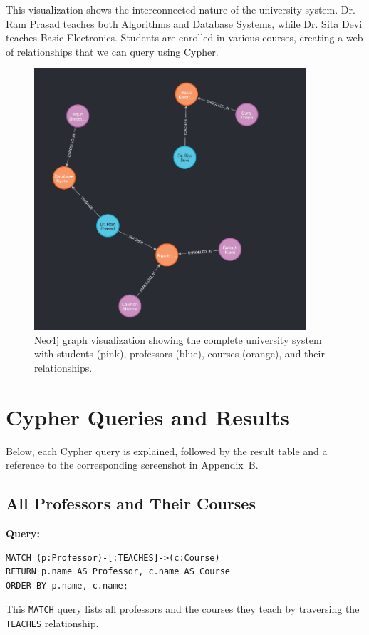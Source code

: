 This visualization shows the interconnected nature of the university system. Dr. Ram Prasad teaches both Algorithms and Database Systems, while Dr. Sita Devi teaches Basic Electronics. Students are enrolled in various courses, creating a web of relationships that we can query using Cypher.

\begin{figure}[H]
  \centering
  \includegraphics[width=0.9\textwidth]{task-3/screenshots/graph-visualization.png}
  \caption{Neo4j graph visualization showing the complete university system with students (pink), professors (blue), courses (orange), and their relationships.}
  \label{fig:graph-visualization}
\end{figure}

\section{Cypher Queries and Results}
Below, each Cypher query is explained, followed by the result table and a reference to the corresponding screenshot in Appendix~B.

\subsection{All Professors and Their Courses}
\textbf{Query:}
\begin{verbatim}
MATCH (p:Professor)-[:TEACHES]->(c:Course)
RETURN p.name AS Professor, c.name AS Course
ORDER BY p.name, c.name;
\end{verbatim}
This \texttt{MATCH} query lists all professors and the courses they teach by traversing the \texttt{TEACHES} relationship.

